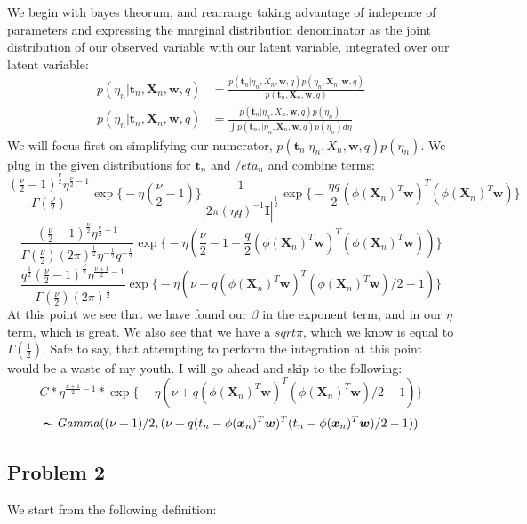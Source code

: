 \documentclass[a4paper,12pt]{article}\usepackage[]{graphicx}\usepackage[]{color}
\begin{document}
We begin with bayes theorum, and rearrange taking advantage of indepence of parameters and expressing the marginal distribution denominator as the joint distribution of our observed variable with our latent variable, integrated over our latent variable:
%
\begin{align*}
p(\eta_n | \bm{t}_n, \bm{X}_n, \bm{w}, q) &= \frac{ p(\bm{t}_n | \eta_n, X_n, \bm{w}, q) p(\eta_n, \bm{X}_n, \bm{w}, q)  }{ p(\bm{t}_n, \bm{X}_n, \bm{w}, q )} \\
p(\eta_n | \bm{t}_n, \bm{X}_n, \bm{w}, q) &= \frac{ p(\bm{t}_n | \eta_n, X_n, \bm{w}, q) p(\eta_n)  }{ \int p(\bm{t}_n, | \eta_n, \bm{X}_n, \bm{w}, q )p(\eta_n) d\eta }
\end{align*}
%
We will focus first on simplifying our numerator, $p(\bm{t}_n | \eta_n, X_n, \bm{w}, q) p(\eta_n)$. We plug in the given distributions for $\bm{t}_n$ and $/eta_n$ and combine terms:
%
$$
\frac{ (\frac{\nu}{2} - 1)^{\frac{\nu}{2}} \eta^{\frac{\nu}{2} - 1} }{ \Gamma(\frac{\nu}{2}) }
\exp \Bigg\{  -\eta(\frac{\nu}{2} - 1)   \Bigg\}
\frac{1}{| 2\pi(\eta q)^{-1} \bm{I} |^{ \frac{1}{2}}}
\exp \Bigg\{  -\frac{\eta q}{2} (\phi(\bm{X}_n)^{T}\bm{w})^T(\phi(\bm{X}_n)^T\bm{w})   \Bigg\}
$$
$$
\frac{ (\frac{\nu}{2} - 1)^{\frac{\nu}{2}} \eta^{\frac{\nu}{2} - 1} }{ \Gamma(\frac{\nu}{2}) (2\pi)^{ \frac{1}{2}} \eta^{- \frac{1}{2}} q^{- \frac{1}{2} } }
\exp \Bigg\{ -\eta(\frac{\nu}{2} - 1 + \frac{q}{2} (\phi(\bm{X}_n)^{T}\bm{w})^T(\phi(\bm{X}_n)^T\bm{w}))   \Bigg\}
$$
$$
\frac{ q^{ \frac{1}{2}} (\frac{\nu}{2} - 1)^{\frac{\nu}{2}} \eta^{\frac{\nu + 1}{2} - 1} } { \Gamma(\frac{\nu}{2}) (2\pi)^{ \frac{1}{2}} }
\exp \Bigg\{ -\eta(\nu + q (\phi(\bm{X}_n)^{T}\bm{w})^T(\phi(\bm{X}_n)^T\bm{w})/2 - 1)   \Bigg\}
$$
%
At this point we see that we have found our $\beta$ in the exponent term, and in our $\eta$ term, which is great. We also see that we have a $sqrt{\pi}$, which we know is equal to $\Gamma(\frac{1}{2})$. Safe to say, that attempting to perform the integration at this point would be a waste of my youth. I will go ahead and skip to the following:
%
$$
C * \eta^{\frac{\nu + 1}{2} - 1} *
\exp \Bigg\{ -\eta(\nu + q (\phi(\bm{X}_n)^{T}\bm{w})^T(\phi(\bm{X}_n)^T\bm{w})/2 - 1)   \Bigg\}
$$
$$
 \thicksim \mathit{Gamma}((\nu + 1)/2, (\nu + q(t_n - \phi(\bm{x}_n)^T\bm{w})^T(t_n - \phi(\bm{x}_n)^T\bm{w})/2 - 1))
$$
\subsection*{Problem 2}

We start from the following definition:
\end{document}
